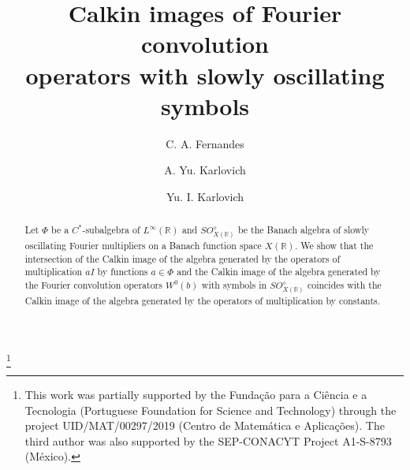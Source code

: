 \documentclass{birkjour}
\numberwithin{equation}{section}
\newcommand{\R}{\mathbb{R}}
\begin{document}
\title[Calkin images of Fourier convolution operators]%
{{Calkin images of Fourier convolution\\
operators with slowly oscillating symbols}}
\author{C. A. Fernandes} %
\address{%
Centro de Matem\'atica e Aplica\c{c}\~oes,\\
Departamento de Matem\'a\-tica, \\
Faculdade de Ci\^encias e Tecnologia,\\
Universidade Nova de Lisboa,\\
Quinta da Torre, \\
2829--516 Caparica, Portugal}
\author{A. Yu. Karlovich}
\address{%
Centro de Matem\'atica e Aplica\c{c}\~oes,\\
Departamento de Matem\'a\-tica, \\
Faculdade de Ci\^encias e Tecnologia,\\
Universidade Nova de Lisboa,\\
Quinta da Torre, \\
2829--516 Caparica, Portugal}
\author{Yu. I. Karlovich}
\address{%
Centro de Investigaci\'on en Ciencias,\\
Instituto de Investigaci\'on en Ciencias B\'asicas y Aplicadas,\\
Universidad Aut\'onoma del Estado de Morelos,\\
Av. Universidad 1001, Col. Chamilpa,\\
C.P. 62209 Cuernavaca, Morelos, M\'exico}
\thanks{%
This work was partially supported by the Funda\c{c}\~ao para a Ci\^encia e a
Tecnologia (Portu\-guese Foundation for Science and Technology) through the
project UID/MAT/00297/2019 (Centro de Matem\'atica e Aplica\c{c}\~oes). The
third author was also supported by the SEP-CONACYT Project A1-S-8793
(M\'exico).}
\begin{abstract}
Let $\Phi$ be a $C^*$-subalgebra of $L^\infty(\R)$
{
and $SO_{X(\R)}^\diamond$ be the Banach algebra of slowly
oscillating Fourier multipliers on a Banach function space $X(\R)$.}
 We show that the intersection of the Calkin
image of the algebra generated by the operators of multiplication $aI$ by
functions $a\in\Phi$ and the Calkin image of the algebra generated by the
Fourier convolution operators $W^0(b)$ with symbols in
{$SO_{X(\R)}^\diamond$}
coincides with the Calkin image of the algebra
generated by the operators of multiplication by constants.
\end{abstract}
\end{document}
